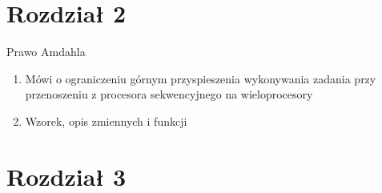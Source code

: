 \documentclass{beamer}
\begin{document}
\section{Rozdział 2}

\begin{frame}{Prawo Amdahla}
  \begin{enumerate}
    \item Mówi o ograniczeniu górnym przyspieszenia wykonywania zadania przy przenoszeniu z procesora sekwencyjnego na wieloprocesory
    \item Wzorek, opis zmiennych i funkcji
  \end{enumerate}
\end{frame}
\section{Rozdział 3}
\end{document}
